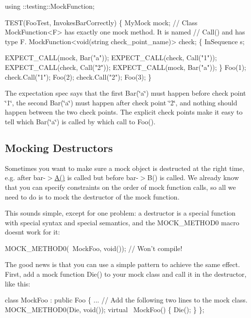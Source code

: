 \begin{DoxyCode}
using ::testing::MockFunction;

TEST(FooTest, InvokesBarCorrectly) \{
  MyMock mock;
  // Class MockFunction<F> has exactly one mock method.  It is named
  // Call() and has type F.
  MockFunction<void(string check\_point\_name)> check;
  \{
    InSequence s;

    EXPECT\_CALL(mock, Bar("a"));
    EXPECT\_CALL(check, Call("1"));
    EXPECT\_CALL(check, Call("2"));
    EXPECT\_CALL(mock, Bar("a"));
  \}
  Foo(1);
  check.Call("1");
  Foo(2);
  check.Call("2");
  Foo(3);
\}
\end{DoxyCode}


The expectation spec says that the first {\ttfamily Bar(\char`\"{}a\char`\"{})} must happen before check point \char`\"{}1\char`\"{}, the second {\ttfamily Bar(\char`\"{}a\char`\"{})} must happen after check point \char`\"{}2\char`\"{}, and nothing should happen between the two check points. The explicit check points make it easy to tell which {\ttfamily Bar(\char`\"{}a\char`\"{})} is called by which call to {\ttfamily Foo()}.

\subsection*{Mocking Destructors}

Sometimes you want to make sure a mock object is destructed at the right time, e.\+g. after {\ttfamily bar-\/$>$\hyperlink{namespacetesting_a5e9134d655d2fc9323902348083282e7}{A()}} is called but before {\ttfamily bar-\/$>$B()} is called. We already know that you can specify constraints on the order of mock function calls, so all we need to do is to mock the destructor of the mock function.

This sounds simple, except for one problem\+: a destructor is a special function with special syntax and special semantics, and the {\ttfamily M\+O\+C\+K\+\_\+\+M\+E\+T\+H\+O\+D0} macro doesn\textquotesingle{}t work for it\+:


\begin{DoxyCode}
MOCK\_METHOD0(~MockFoo, void());  // Won't compile!
\end{DoxyCode}


The good news is that you can use a simple pattern to achieve the same effect. First, add a mock function {\ttfamily Die()} to your mock class and call it in the destructor, like this\+:


\begin{DoxyCode}
class MockFoo : public Foo \{
  ...
  // Add the following two lines to the mock class.
  MOCK\_METHOD0(Die, void());
  virtual ~MockFoo() \{ Die(); \}
\};
\end{DoxyCode}


